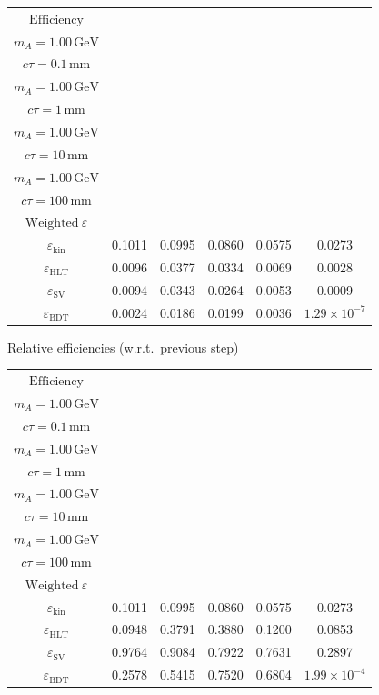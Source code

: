 \documentclass[10pt,a4paper]{article}
\begin{document}
{\begin{tabular}{cccccc}
\toprule
$\mathrm{Efficiency}$ & \shortstack{$m_{\pi}=10\,\mathrm{GeV}$\\$m_{A}=1.00\,\mathrm{GeV}$\\$c\tau=0.1\,\mathrm{mm}$} & \shortstack{$m_{\pi}=10\,\mathrm{GeV}$\\$m_{A}=1.00\,\mathrm{GeV}$\\$c\tau=1\,\mathrm{mm}$} & \shortstack{$m_{\pi}=10\,\mathrm{GeV}$\\$m_{A}=1.00\,\mathrm{GeV}$\\$c\tau=10\,\mathrm{mm}$} & \shortstack{$m_{\pi}=10\,\mathrm{GeV}$\\$m_{A}=1.00\,\mathrm{GeV}$\\$c\tau=100\,\mathrm{mm}$} & \shortstack{$\mathrm{QCD}$\\$\mathrm{Weighted}\ \varepsilon$} \\
\midrule
$\varepsilon_{\mathrm{kin}}$ & 0.1011 & 0.0995 & 0.0860 & 0.0575 & 0.0273\\
$\varepsilon_{\mathrm{HLT}}$ & 0.0096 & 0.0377 & 0.0334 & 0.0069 & 0.0028\\
$\varepsilon_{\mathrm{SV}}$ & 0.0094 & 0.0343 & 0.0264 & 0.0053 & 0.0009\\
$\varepsilon_{\mathrm{BDT}}$ & 0.0024 & 0.0186 & 0.0199 & 0.0036 & $1.29\times10^{-7}$\\
\bottomrule
\end{tabular}

\vspace{18pt}

Relative efficiencies (w.r.t.\ previous step)

\begin{tabular}{cccccc}
\toprule
$\mathrm{Efficiency}$ & \shortstack{$m_{\pi}=10\,\mathrm{GeV}$\\$m_{A}=1.00\,\mathrm{GeV}$\\$c\tau=0.1\,\mathrm{mm}$} & \shortstack{$m_{\pi}=10\,\mathrm{GeV}$\\$m_{A}=1.00\,\mathrm{GeV}$\\$c\tau=1\,\mathrm{mm}$} & \shortstack{$m_{\pi}=10\,\mathrm{GeV}$\\$m_{A}=1.00\,\mathrm{GeV}$\\$c\tau=10\,\mathrm{mm}$} & \shortstack{$m_{\pi}=10\,\mathrm{GeV}$\\$m_{A}=1.00\,\mathrm{GeV}$\\$c\tau=100\,\mathrm{mm}$} & \shortstack{$\mathrm{QCD}$\\$\mathrm{Weighted}\ \varepsilon$} \\
\midrule
$\varepsilon_{\mathrm{kin}}$ & 0.1011 & 0.0995 & 0.0860 & 0.0575 & 0.0273\\
$\varepsilon_{\mathrm{HLT}}$ & 0.0948 & 0.3791 & 0.3880 & 0.1200 & 0.0853\\
$\varepsilon_{\mathrm{SV}}$ & 0.9764 & 0.9084 & 0.7922 & 0.7631 & 0.2897\\
$\varepsilon_{\mathrm{BDT}}$ & 0.2578 & 0.5415 & 0.7520 & 0.6804 & $1.99\times10^{-4}$\\
\bottomrule
\end{tabular}

}
\end{document}
